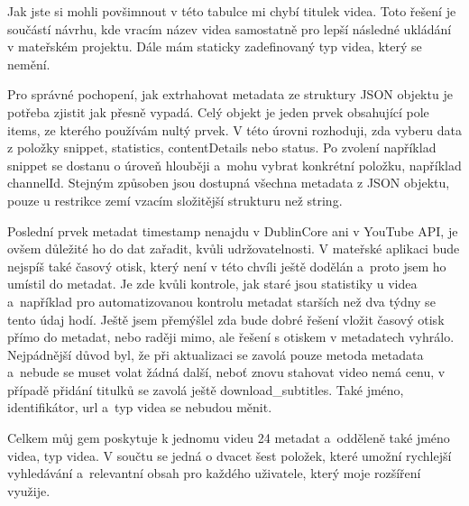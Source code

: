 \par Jak jste si mohli povšimnout v této tabulce mi chybí titulek videa. Toto řešení je součástí návrhu, kde vracím název videa samostatně pro lepší následné ukládání v mateřském projektu. Dále mám staticky zadefinovaný typ videa, který se nemění. 
\par Pro správné pochopení, jak extrhahovat metadata ze struktury JSON objektu je potřeba zjistit jak přesně vypadá. Celý objekt je jeden prvek obsahující pole items, ze kterého používám nultý prvek. V této úrovni rozhoduji, zda vyberu data z položky snippet, statistics, contentDetails nebo status. Po zvolení například snippet se dostanu o úroveň hlouběji a~mohu vybrat konkrétní položku, například channelId. Stejným způsoben jsou dostupná všechna metadata z JSON objektu, pouze u restrikce zemí vzacím složitější strukturu než string.
\par Poslední prvek metadat timestamp nenajdu v DublinCore ani v YouTube API, je ovšem důležité ho do dat zařadit, kvůli udržovatelnosti. V mateřské aplikaci bude nejspíš také časový otisk, který není v této chvíli ještě dodělán a~proto jsem ho umístil do metadat. Je zde kvůli kontrole, jak staré jsou statistiky u videa a~například pro automatizovanou kontrolu metadat starších než dva týdny se tento údaj hodí. Ještě jsem přemýšlel zda bude dobré řešení vložit časový otisk přímo do metadat, nebo raději mimo, ale řešení s otiskem v metadatech vyhrálo. Nejpádnější důvod byl, že při aktualizaci se zavolá pouze metoda metadata a~nebude se muset volat žádná další, neboť znovu stahovat video nemá cenu, v případě přidání titulků se zavolá ještě download\_subtitles. Také jméno, identifikátor, url a~typ videa se nebudou měnit.
\par Celkem můj gem poskytuje k jednomu videu 24 metadat a~odděleně také jméno videa, typ videa. V součtu se jedná o dvacet šest položek, které umožní rychlejší vyhledávání a~relevantní obsah pro každého uživatele, který moje rozšíření využije.

